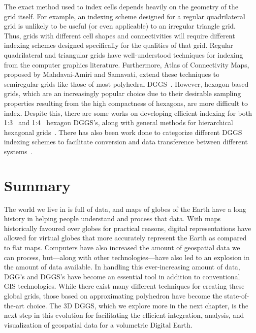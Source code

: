 The exact method used to index cells depends heavily on the geometry of the grid itself.
For example, an indexing scheme designed for a regular quadrilateral grid is unlikely to be useful (or even applicable) to an irregular triangle grid.
Thus, grids with different cell shapes and connectivities will require different indexing schemes designed specifically for the qualities of that grid.
Regular quadrilateral and triangular grids have well-understood techniques for indexing from the computer graphics literature.
Furthermore, Atlas of Connectivity Maps, proposed by Mahdavai-Amiri and Samavati, extend these techniques to semiregular grids like those of most polyhedral DGGS~\cite{mahdavi2014atlas}.
However, hexagon based grids, which are an increasingly popular choice due to their desirable sampling properties resulting from the high compactness of hexagons, are more difficult to index.
Despite this, there are some works on developing efficient indexing for both 1:3~\cite{vince2006indexing} and 1:4~\cite{tong2013efficient} hexagon DGGS's, along with general methods for hierarchical hexagonal grids~\cite{mahdavi2015hexagonal}.
There has also been work done to categorize different DGGS indexing schemes to facilitate conversion and data transference between different systems~\cite{mahdavi2015categorization}.


\section{Summary} \label{chap:2:summary}
The world we live in is full of data, and maps of globes of the Earth have a long history in helping people understand and process that data.
With maps historically favoured over globes for practical reasons, digital representations have allowed for virtual globes that more accurately represent the Earth as compared to flat maps.
Computers have also increased the amount of geospatial data we can process, but---along with other technologies---have also led to an explosion in the amount of data available.
In handling this ever-increasing amount of data, DGG's and DGGS's have become an essential tool in addition to conventional GIS technologies.
While there exist many different techniques for creating these global grids, those based on approximating polyhedron have become the state-of-the-art choice.
The 3D DGGS, which we explore more in the next chapter, is the next step in this evolution for facilitating the efficient integration, analysis, and visualization of geospatial data for a volumetric Digital Earth.
